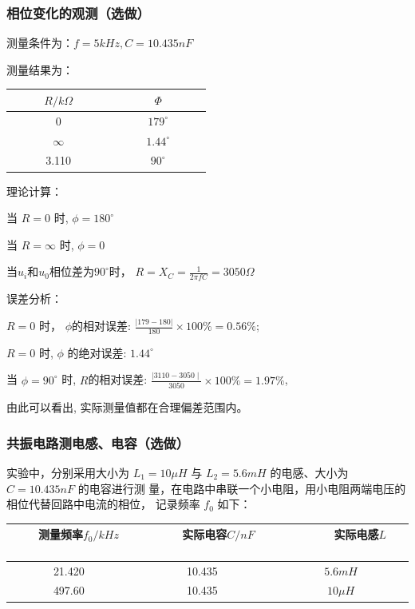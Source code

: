 \documentclass[UTF8]{ctexart}
\begin{document}
\subsubsection{相位变化的观测（选做）}

测量条件为：$f=5kHz,C=10.435nF$

测量结果为：
\begin{center}
    \begin{tabular}{|c|c|}
        \hline  ~~~~~$R/k\Omega$~~~~~&~~~~~~$\Phi$~~~~~~\\
        \hline  0&$179^\circ$\\
        \hline $\infty$&$1.44^\circ$\\
        \hline 3.110&$90^\circ$\\     
        \hline
    \end{tabular}
\end{center}

理论计算：

当  $R=0$  时,  $\phi=180^{\circ} $

当  $R=\infty$  时,  $\phi=0 $

当$u_i$和$u_0$相位差为$90^\circ$时，
$R=X_{C}=\frac{1}{2 \pi f C}=3050\Omega$

误差分析：

$R=0 $ 时， $ \phi  $的相对误差:  $\frac{|179-180|}{180} \times 100 \%=0.56 \% $;

$R=0$  时, $ \phi $ 的绝对误差: $1.44^\circ$

当  $\phi=90^{\circ}$  时, $ R  $的相对误差: $ \frac{\mid 3110-3050\mid}{3050} \times 100 \%=1.97 \% $,

由此可以看出, 实际测量值都在合理偏差范围内。




\subsubsection{共振电路测电感、电容（选做）}

实验中，分别采用大小为 $L_1 = 10\mu H$ 与 $L_2 = 5.6mH$ 的电感、大小为 $C = 10.435nF$ 的电容进行测
量，在电路中串联一个小电阻，用小电阻两端电压的相位代替回路中电流的相位，
记录频率 $f_0$ 如下：

\begin{center}
    \begin{tabular}{|c|c|c|}
        \hline  ~~~测量频率$f_0/kHz$~~~&~~~~~实际电容$C/nF$~~~~~&~~~~~~实际电感$L$~~~~~~\\
        \hline  21.420&10.435&$5.6mH$\\
        \hline  497.60&10.435&$10\mu H$\\    
        \hline
    \end{tabular}
\end{center}
\end{document}
